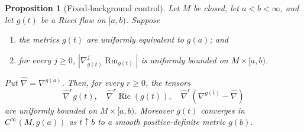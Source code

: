 \documentclass[10pt]{coll-l}
\newtheorem{proposition}[theorem]{Proposition}
\theoremstyle{definition}
\theoremstyle{remark}
\numberwithin{section}{chapter}
\numberwithin{equation}{chapter}
\newcommand{\Ric}{\operatorname{Ric}}
\newcommand{\Rm}{\operatorname{Rm}}
\begin{document}
\begin{proposition}[Fixed-background control]
\label{prop:shi-fixed-background-control}
Let $M$ be closed, let $a<b<\infty$, and let $g(t)$ be a Ricci flow on
$[a,b)$.  Suppose
\begin{enumerate}
\item the metrics $g(t)$ are uniformly equivalent to $g(a)$; and
\item for every $j\geq0$, $|\nabla_{g(t)}^j\Rm_{g(t)}|$ is uniformly bounded
      on $M\times[a,b)$.
\end{enumerate}
Put $\widehat\nabla=\nabla^{g(a)}$.  Then, for every $r\geq0$, the tensors
\begin{equation}
 \widehat\nabla^r g(t),\quad
 \widehat\nabla^r\Ric(g(t)),\quad
 \widehat\nabla^r(\nabla^{g(t)}-\widehat\nabla)           \label{eq:shi-background-controlled-list}
\end{equation}
are uniformly bounded on $M\times[a,b)$.  Moreover $g(t)$ converges in
$C^\infty(M,g(a))$ as $t\uparrow b$ to a smooth positive-definite metric
$g(b)$.
\end{proposition}
\end{document}

